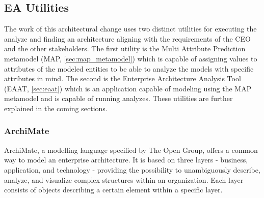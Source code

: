 \subsection{EA Utilities}
\label{sec:ea_utilities}
The work of this architectural change uses two distinct utilities for executing the analyze and finding an architecture aligning with the requirements of the CEO and the other stakeholders. The first utility is the Multi Attribute Prediction metamodel (MAP, \vref{sec:map_metamodel}) which is capable of assigning values to attributes of the modeled entities to be able to analyze the models with specific attributes in mind. The second is the Enterprise Architecture Analysis Tool (EAAT, \vref{sec:eaat}) which is an application capable of modeling using the MAP metamodel and is capable of running analyzes. These utilities are further explained in the coming sections.
\subsubsection{ArchiMate}
\label{sec:archimate}
ArchiMate, a modelling language specified by The Open Group, offers a common way to model an enterprise architecture. It is based on three layers - business, application, and technology - providing the possibility to unambiguously describe, analyze, and visualize complex structures within an organization. Each layer consists of objects describing a certain element within a specific layer.
